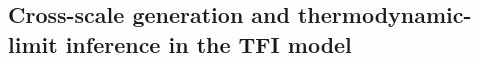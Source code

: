 \documentclass[pdflatex,sn-nature]{sn-jnl}%
\theoremstyle{thmstyleone}%
\theoremstyle{thmstyletwo}%
\theoremstyle{thmstylethree}%
\begin{document}



\subsection{Cross-scale generation and thermodynamic-limit inference in the TFI model}

\end{document}
